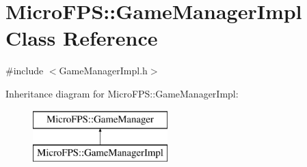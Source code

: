 \hypertarget{class_micro_f_p_s_1_1_game_manager_impl}{
\section{MicroFPS::GameManagerImpl Class Reference}
\label{d8/daa/class_micro_f_p_s_1_1_game_manager_impl}
}


{\ttfamily \#include $<$GameManagerImpl.h$>$}

Inheritance diagram for MicroFPS::GameManagerImpl:\begin{figure}[H]
\begin{center}
\leavevmode
\includegraphics[height=2.000000cm]{d8/daa/class_micro_f_p_s_1_1_game_manager_impl}
\end{center}
\end{figure}
